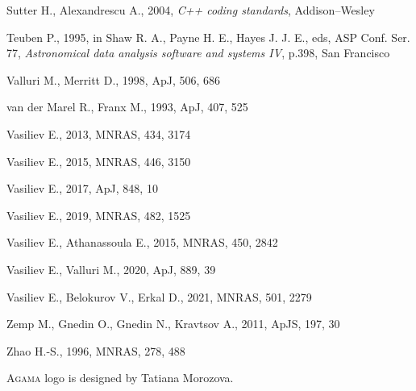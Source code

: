 \documentclass[12pt]{article}
\newcommand{\Agama}{\textsc{Agama}\xspace}
\begin{document}
\begin{thebibliography}{99}
Sutter H., Alexandrescu A., 2004, \textsl{C++ coding standards}, Addison--Wesley

Teuben P., 1995, in Shaw R. A., Payne H. E., Hayes J. J. E., eds, ASP Conf. Ser. 77,
\textsl{Astronomical data analysis software and systems IV}, p.398, San Francisco

Valluri M., Merritt D., 1998, ApJ, 506, 686

van der Marel R., Franx M., 1993, ApJ, 407, 525

Vasiliev E., 2013, MNRAS, 434, 3174

Vasiliev E., 2015, MNRAS, 446, 3150

Vasiliev E., 2017, ApJ, 848, 10

Vasiliev E., 2019, MNRAS, 482, 1525

Vasiliev E., Athanassoula E., 2015, MNRAS, 450, 2842

Vasiliev E., Valluri M., 2020, ApJ, 889, 39

Vasiliev E., Belokurov V., Erkal D., 2021, MNRAS, 501, 2279

Zemp M., Gnedin O., Gnedin N., Kravtsov A., 2011, ApJS, 197, 30

Zhao H.-S., 1996, MNRAS, 278, 488

\end{thebibliography}

\vspace{-3mm}\noindent \Agama logo is designed by Tatiana Morozova.
\end{document}
